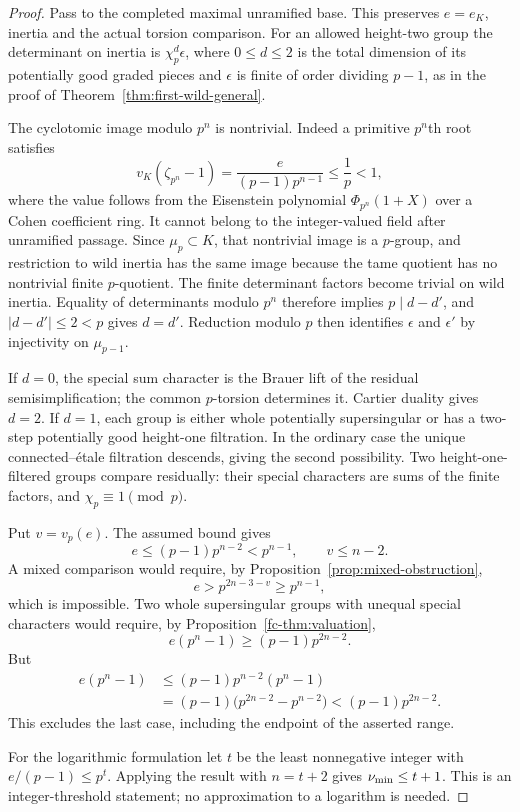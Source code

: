 \begin{proof}
Pass to the completed maximal unramified base. This preserves $e=e_K$, inertia and the actual torsion comparison. For an allowed height-two group the determinant on inertia is $\chi_p^d\epsilon$, where $0\le d\le2$ is the total dimension of its potentially good graded pieces and $\epsilon$ is finite of order dividing $p-1$, as in the proof of Theorem~\ref{thm:first-wild-general}.

The cyclotomic image modulo $p^n$ is nontrivial. Indeed a primitive $p^n$th root satisfies
\[
 v_K(\zeta_{p^n}-1)=\frac{e}{(p-1)p^{n-1}}\le\frac1p<1,
\]
where the value follows from the Eisenstein polynomial $\Phi_{p^n}(1+X)$ over a Cohen coefficient ring. It cannot belong to the integer-valued field after unramified passage. Since $\mu_p\subset K$, that nontrivial image is a $p$-group, and restriction to wild inertia has the same image because the tame quotient has no nontrivial finite $p$-quotient. The finite determinant factors become trivial on wild inertia. Equality of determinants modulo $p^n$ therefore implies $p\mid d-d'$, and $|d-d'|\le2<p$ gives $d=d'$. Reduction modulo $p$ then identifies $\epsilon$ and $\epsilon'$ by injectivity on $\mu_{p-1}$.

If $d=0$, the special sum character is the Brauer lift of the residual semisimplification; the common $p$-torsion determines it. Cartier duality gives $d=2$. If $d=1$, each group is either whole potentially supersingular or has a two-step potentially good height-one filtration. In the ordinary case the unique connected--\'etale filtration descends, giving the second possibility. Two height-one-filtered groups compare residually: their special characters are sums of the finite factors, and $\chi_p\equiv1\pmod p$.

Put $v=v_p(e)$. The assumed bound gives
\[
                    e\le(p-1)p^{n-2}<p^{n-1},\qquad v\le n-2.
\]
A mixed comparison would require, by Proposition~\ref{prop:mixed-obstruction},
\[
                        e>p^{2n-3-v}\ge p^{n-1},
\]
which is impossible. Two whole supersingular groups with unequal special characters would require, by Proposition~\ref{fc-thm:valuation},
\[
                         e(p^n-1)\ge(p-1)p^{2n-2}.
\]
But
\[
 \begin{aligned}
 e(p^n-1)&\le(p-1)p^{n-2}(p^n-1)\\
         &=(p-1)\bigl(p^{2n-2}-p^{n-2}\bigr)
          <(p-1)p^{2n-2}.
 \end{aligned}
\]
This excludes the last case, including the endpoint of the asserted range.

For the logarithmic formulation let $t$ be the least nonnegative integer with $e/(p-1)\le p^t$. Applying the result with $n=t+2$ gives $\nu_{\min}\le t+1$. This is an integer-threshold statement; no approximation to a logarithm is needed.
\end{proof}

